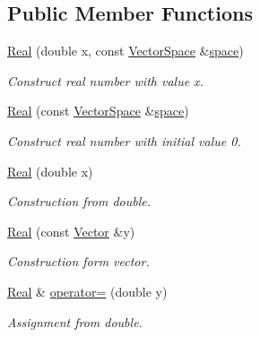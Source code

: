 \subsection*{Public Member Functions}
\begin{DoxyCompactItemize}
\item 
\hyperlink{classSpacy_1_1Real_a7c8581cf79ac0d3ffdc31179d31d8e30_a7c8581cf79ac0d3ffdc31179d31d8e30}{Real} (double x, const \hyperlink{classSpacy_1_1VectorSpace}{Vector\+Space} \&\hyperlink{classSpacy_1_1VectorBase_a95e87ce98f5a7646055d4e87e6024044_a95e87ce98f5a7646055d4e87e6024044}{space})
\begin{DoxyCompactList}\small\item\em Construct real number with value x. \end{DoxyCompactList}\item 
\hyperlink{classSpacy_1_1Real_a5ae2b93ceddb594b142b3706e4cc9c83_a5ae2b93ceddb594b142b3706e4cc9c83}{Real} (const \hyperlink{classSpacy_1_1VectorSpace}{Vector\+Space} \&\hyperlink{classSpacy_1_1VectorBase_a95e87ce98f5a7646055d4e87e6024044_a95e87ce98f5a7646055d4e87e6024044}{space})
\begin{DoxyCompactList}\small\item\em Construct real number with initial value 0. \end{DoxyCompactList}\item 
\hyperlink{classSpacy_1_1Real_ad0f157978475b3c9942a1bcdceb41ab0_ad0f157978475b3c9942a1bcdceb41ab0}{Real} (double x)
\begin{DoxyCompactList}\small\item\em Construction from double. \end{DoxyCompactList}\item 
\hyperlink{classSpacy_1_1Real_a2f9408a9cf34d8119139c73ddda83cc5_a2f9408a9cf34d8119139c73ddda83cc5}{Real} (const \hyperlink{classSpacy_1_1Vector}{Vector} \&y)
\begin{DoxyCompactList}\small\item\em Construction form vector. \end{DoxyCompactList}\item 
\hyperlink{classSpacy_1_1Real}{Real} \& \hyperlink{classSpacy_1_1Real_a2c90e84d6c6732b6812d371b7ccf3a18_a2c90e84d6c6732b6812d371b7ccf3a18}{operator=} (double y)
\begin{DoxyCompactList}\small\item\em Assignment from double. \end{DoxyCompactList}\item 

\end{DoxyCompactItemize}

